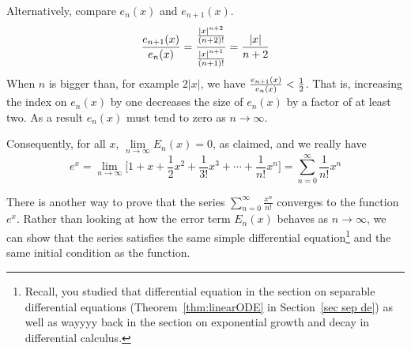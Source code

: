 \begin{eg}[Optional --- Why  $\sum_{n=0}^\infty \frac{1}{n!}x^n$ is $e^x$.]
Alternatively, compare $e_n(x)$ and $e_{n+1}(x)$.
\begin{equation*}
\frac{e_{n+1}(x)}{e_n(x)}
     =\frac{\vphantom{\Big[}\tfrac{|x|^{n+2}}{(n+2)!}}
           {\vphantom{\Big[}\tfrac{|x|^{n+1}}{(n+1)!}}
     =\frac{|x|}{n+2}
\end{equation*}
When $n$ is  bigger than, for example $2|x|$, we have $\tfrac{e_{n+1}(x)}{e_n(x)}<\tfrac{1}{2}$. That is, increasing the index
on $e_n(x)$ by one decreases the size of $e_n(x)$ by a factor of at least two. As a result $e_n(x)$ must tend to zero
as $n\rightarrow\infty$.


Consequently, for all $x$,  $\lim\limits_{n\rightarrow\infty}E_n(x)=0$,
as claimed, and we really have
\begin{equation*}
e^x=\lim_{n\rightarrow\infty}\Big[1 +x + \frac{1}{2} x^2
     +\frac{1}{3!} x^3+\cdots+\frac{1}{n!} x^n\Big]
    =\sum_{n=0}^\infty \frac{1}{n!}x^n
\end{equation*}
\end{eg}



There is another way to prove that the series $\sum_{n=0}^\infty \frac{x^n}{n!}$ converges to the function $e^x$.
Rather than looking at how the error term $E_n(x)$ behaves as $n \to \infty$, we can show that the series
satisfies the same simple differential equation\footnote{Recall, you studied that differential equation in the
section on separable differential equations (Theorem~\ref{thm:linearODE} in Section~\ref{sec sep de}) as well as
wayyyy back in the section on exponential growth and decay in differential calculus.} and the same initial condition as the function.


